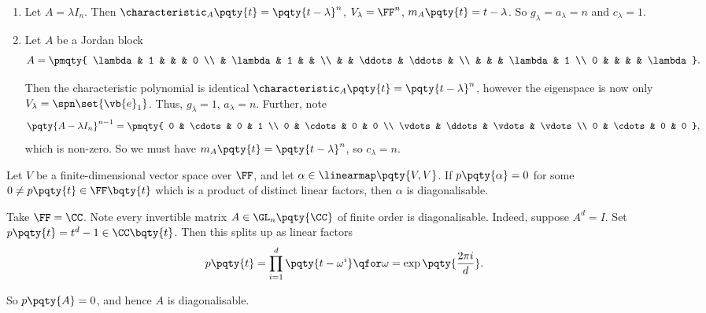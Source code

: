 \begin{example}
    \begin{enumerate}[label=(\roman*)]
        \item Let \(A = \lambda I_n\). Then \(\characteristic_{A} \pqty{t} = \pqty{t - \lambda}^n\), \(V_{\lambda} = \FF^n\), \(m_{A}\pqty{t} = t - \lambda\). So \(g_{\lambda} = a_{\lambda} = n\) and \(c_{\lambda} = 1\).
        \item Let \(A\) be a Jordan block
        \[
            A = \pmqty{
                \lambda & 1 & & & 0 \\
                 & \lambda & 1 & & \\
                 &  & \ddots & \ddots & \\
                 & & & \lambda & 1 \\
                0 & & & & \lambda
            }.
        \]

        Then the characteristic polynomial is identical \(\characteristic_{A} \pqty{t} = \pqty{t - \lambda}^n\), however the eigenspace is now only \(V_{\lambda} = \spn\set{\vb{e}_1}\). Thus, \(g_{\lambda} = 1\), \(a_{\lambda} = n\). Further, note
        \[
            \pqty{A - \lambda I_n}^{n - 1} = \pmqty{
                0 & \cdots & 0 & 1 \\
                0 & \cdots & 0 & 0 \\
                \vdots & \ddots & \vdots & \vdots \\
                0 & \cdots & 0 & 0
            },
        \]
        which is non-zero. So we must have \(m_A\pqty{t} = \pqty{t - \lambda}^n\), so \(c_{\lambda} = n\).
    \end{enumerate}
\end{example}

\begin{theorem}
    \label{thm:diagonalisability-factorisation-minimal-polynomial}%
    Let \(V\) be a finite-dimensional vector space over \(\FF\), and let \(\alpha \in \linearmap\pqty{V, V}\). If \(p\pqty{\alpha} = 0\) for some \(0 \neq p\pqty{t} \in \FF\bqty{t}\) which is a product of distinct linear factors, then \(\alpha\) is diagonalisable.
\end{theorem}

\begin{example}
    Take \(\FF = \CC\). Note every invertible matrix \(A \in \GL_n\pqty{\CC}\) of finite order is diagonalisable. Indeed, suppose \(A^d = I\). Set \(p\pqty{t} = t^d - 1 \in \CC\bqty{t}\). Then this splits up as linear factors
    \[
        p\pqty{t} = \prod_{i = 1}^{d} \pqty{t - \omega^i} \qfor \omega = \exp\pqty{\frac{2 \pi i}{d}}.
    \]

    So \(p\pqty{A} = 0\), and hence \(A\) is diagonalisable.
\end{example}

